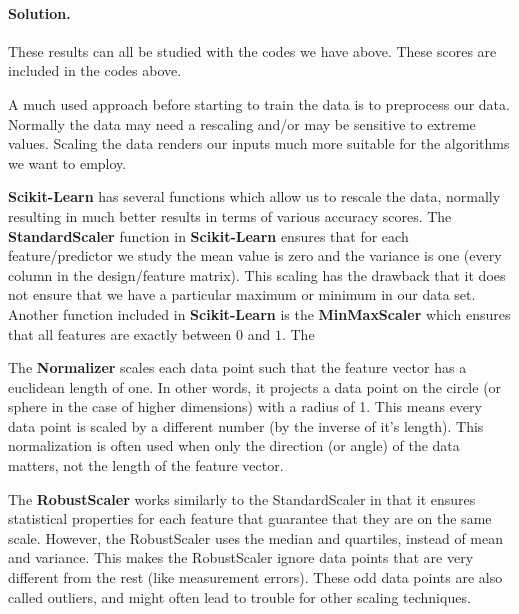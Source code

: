 \documentclass[%
oneside,                 %
final,                   %
10pt]{article}
\newenvironment{doconceexercise}{}{}
\newcounter{doconceexercisecounter}
\begin{document}
\begin{doconceexercise}
\paragraph{Solution.}
These results can all be studied with the codes we have above. These scores are included in the codes above.


\end{doconceexercise}




\begin{doconceexercise}

                             

A much used approach before starting to train the data is  to preprocess our
data. Normally the data may need a rescaling and/or may be sensitive
to extreme values. Scaling the data renders our inputs much more
suitable for the algorithms we want to employ.

\textbf{Scikit-Learn} has several functions which allow us to rescale the
data, normally resulting in much better results in terms of various
accuracy scores.  The \textbf{StandardScaler} function in \textbf{Scikit-Learn}
ensures that for each feature/predictor we study the mean value is
zero and the variance is one (every column in the design/feature
matrix).  This scaling has the drawback that it does not ensure that
we have a particular maximum or minimum in our data set. Another
function included in \textbf{Scikit-Learn} is the \textbf{MinMaxScaler} which
ensures that all features are exactly between $0$ and $1$. The


The \textbf{Normalizer} scales each data
point such that the feature vector has a euclidean length of one. In other words, it
projects a data point on the circle (or sphere in the case of higher dimensions) with a
radius of 1. This means every data point is scaled by a different number (by the
inverse of it’s length).
This normalization is often used when only the direction (or angle) of the data matters,
not the length of the feature vector.

The \textbf{RobustScaler} works similarly to the StandardScaler in that it
ensures statistical properties for each feature that guarantee that
they are on the same scale. However, the RobustScaler uses the median
and quartiles, instead of mean and variance. This makes the
RobustScaler ignore data points that are very different from the rest
(like measurement errors). These odd data points are also called
outliers, and might often lead to trouble for other scaling
techniques.



\end{doconceexercise}
\end{document}
